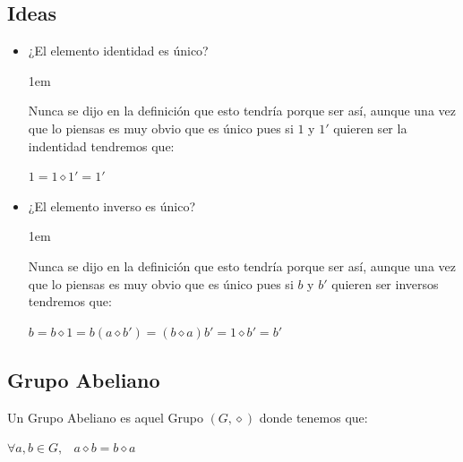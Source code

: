 \documentclass[12pt, fleqn]{report}                             %
\newenvironment{SmallIndentation}[1][0.75em]                    %
        {\begin{adjustwidth}{#1}{}\begin{footnotesize}}             %
        {\end{footnotesize}\end{adjustwidth}}                       %
\DeclareMathOperator \Space     {\quad}                         %
\DeclareMathOperator \MiniSpace {\;}                            %
\theoremstyle{break}                                            %
\begin{document}
           
            \subsection{Ideas}

                \begin{itemize}
                    \item ¿El elemento identidad es único?

                    \begin{SmallIndentation}[1em]
                        Nunca se dijo en la definición que esto tendría porque ser
                        así, aunque una vez que lo piensas es muy obvio que es único
                        pues si $1$ y $1'$ quieren ser la indentidad tendremos que:

                        $1 = 1 \diamond 1' = 1'$
                    \end{SmallIndentation}

                    \item ¿El elemento inverso es único?

                    \begin{SmallIndentation}[1em]
                        Nunca se dijo en la definición que esto tendría porque ser
                        así, aunque una vez que lo piensas es muy obvio que es único
                        pues si $b$ y $b'$ quieren ser inversos tendremos que:

                        $b = b \diamond 1 = b (a \diamond b') = (b \diamond a) b' = 1 \diamond b' = b'$
                    \end{SmallIndentation}
                \end{itemize}




            \clearpage
            \subsection{Grupo Abeliano}

                Un Grupo Abeliano es aquel Grupo $(G, \diamond)$ donde tenemos que:

                $\forall a, b \in G, \MiniSpace a \diamond b = b \diamond a$
\end{document}
